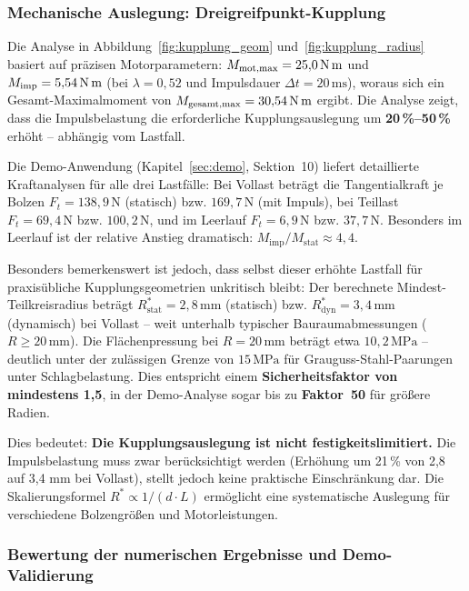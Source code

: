﻿\documentclass[a4paper,12pt]{article}
\begin{document}
\subsubsection*{Mechanische Auslegung: Dreigreifpunkt-Kupplung}

Die Analyse in Abbildung~\ref{fig:kupplung_geom} und~\ref{fig:kupplung_radius}
basiert auf präzisen Motorparametern: $M_\text{mot,max} = 25{,}0\,\text{N\,m}$
und $M_\text{imp} = 5{,}54\,\text{N\,m}$ (bei $\lambda = 0{,}52$ und
Impulsdauer $\Delta t = 20\,\text{ms}$), woraus sich ein Gesamt-Maximalmoment
von $M_\text{gesamt,max} = 30{,}54\,\text{N\,m}$ ergibt. Die Analyse zeigt,
dass die Impulsbelastung die erforderliche Kupplungsauslegung um
\textbf{20\,\%--50\,\%} erhöht -- abhängig vom Lastfall.

Die Demo-Anwendung (Kapitel~\ref{sec:demo}, Sektion~10) liefert detaillierte
Kraftanalysen für alle drei Lastfälle: Bei Vollast beträgt die Tangentialkraft
je Bolzen $F_t = 138{,}9\,\text{N}$ (statisch) bzw. $169{,}7\,\text{N}$
(mit Impuls), bei Teillast $F_t = 69{,}4\,\text{N}$ bzw. $100{,}2\,\text{N}$,
und im Leerlauf $F_t = 6{,}9\,\text{N}$ bzw. $37{,}7\,\text{N}$. Besonders
im Leerlauf ist der relative Anstieg dramatisch:
$M_\text{imp}/M_\text{stat} \approx 4{,}4$.

Besonders bemerkenswert ist jedoch, dass selbst dieser erhöhte Lastfall
für praxisübliche Kupplungsgeometrien unkritisch bleibt: Der berechnete
Mindest-Teilkreisradius beträgt $R^*_\text{stat} = 2{,}8\,\text{mm}$
(statisch) bzw. $R^*_\text{dyn} = 3{,}4\,\text{mm}$ (dynamisch) bei Vollast
-- weit unterhalb typischer Bauraumabmessungen ($R \geq 20\,\text{mm}$).
Die Flächenpressung bei $R = 20\,\text{mm}$ beträgt etwa $10{,}2\,\text{MPa}$
-- deutlich unter der zulässigen Grenze von $15\,\text{MPa}$ für
Grauguss-Stahl-Paarungen unter Schlagbelastung. Dies entspricht einem
\textbf{Sicherheitsfaktor von mindestens 1{,}5}, in der Demo-Analyse
sogar bis zu \textbf{Faktor~50} für größere Radien.

Dies bedeutet: \textbf{Die Kupplungsauslegung ist nicht festigkeitslimitiert.}
Die Impulsbelastung muss zwar berücksichtigt werden (Erhöhung um 21\,\%
von 2{,}8 auf 3{,}4 mm bei Vollast), stellt jedoch keine praktische
Einschränkung dar. Die Skalierungsformel $R^* \propto 1/(d \cdot L)$
ermöglicht eine systematische Auslegung für verschiedene Bolzengrößen
und Motorleistungen.

\subsubsection*{Bewertung der numerischen Ergebnisse und Demo-Validierung}
\end{document}

